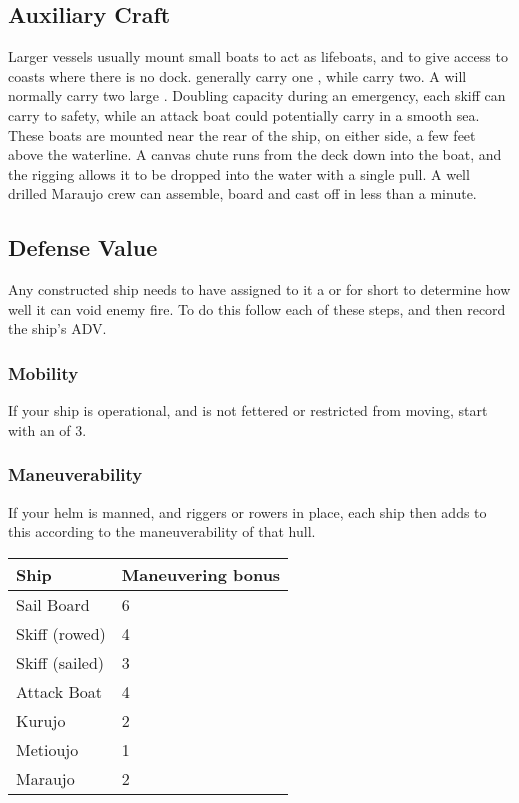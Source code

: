 \begin{multicols*}{2}
\subsection{Auxiliary Craft}
Larger vessels usually mount small boats to act as lifeboats, and to give access to coasts where there is no dock.  generally carry one , while  carry two. A  will normally carry two large . Doubling capacity during an emergency, each skiff can carry  to safety, while an attack boat could potentially carry  in a smooth sea. These boats are mounted near the rear of the ship, on either side, a few feet above the waterline. A canvas chute runs from the deck down into the boat, and the rigging allows it to be dropped into the water with a single pull. A well drilled Maraujo crew can assemble, board and cast off in less than a minute.
\subsection{Defense Value}
Any constructed ship needs to have assigned to it a  or \ADV for short to determine how well it can void enemy fire. To do this follow each of these steps, and then record the ship’s ADV.
\subsubsection{Mobility}
If your ship is operational, and is not fettered or restricted from moving, start with an \ADV of 3.
\subsubsection{Maneuverability}
If your helm is manned, and riggers or rowers in place, each ship then adds to this \ADV according to the maneuverability of that hull.

\begin{normbox}
\small
\begin{tabular}{@{} l l}
\textbf{Ship} & \textbf{Maneuvering bonus}\\
\hline
Sail Board & 6\\
Skiff (rowed) & 4\\
Skiff (sailed)  & 3\\
Attack Boat & 4\\
Kurujo & 2\\
Metioujo & 1\\
Maraujo & 2\\
\end{tabular}
\end{normbox}


\end{multicols*}

